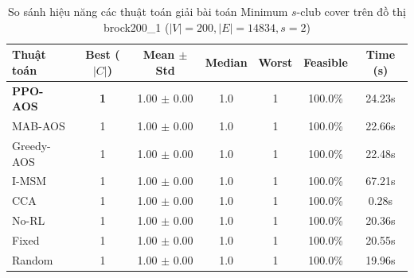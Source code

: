 \begin{table}[htbp]
\centering
\caption{So sánh hiệu năng các thuật toán giải bài toán Minimum $s$-club cover trên đồ thị brock200_1 ($|V|=200, |E|=14834, s=2$)}
\label{tab:results_brock200_1}
\begin{tabular}{lcccccc}
\hline
\textbf{Thuật toán} & \textbf{Best ($|C|$)} & \textbf{Mean $\pm$ Std} & \textbf{Median} & \textbf{Worst} & \textbf{Feasible} & \textbf{Time (s)} \\
\hline
\textbf{PPO-AOS} & \textbf{1} & 1.00 $\pm$ 0.00 & 1.0 & 1 & 100.0\% & 24.23s \\
MAB-AOS & 1 & 1.00 $\pm$ 0.00 & 1.0 & 1 & 100.0\% & 22.66s \\
Greedy-AOS & 1 & 1.00 $\pm$ 0.00 & 1.0 & 1 & 100.0\% & 22.48s \\
I-MSM & 1 & 1.00 $\pm$ 0.00 & 1.0 & 1 & 100.0\% & 67.21s \\
CCA & 1 & 1.00 $\pm$ 0.00 & 1.0 & 1 & 100.0\% & 0.28s \\
No-RL & 1 & 1.00 $\pm$ 0.00 & 1.0 & 1 & 100.0\% & 20.36s \\
Fixed & 1 & 1.00 $\pm$ 0.00 & 1.0 & 1 & 100.0\% & 20.55s \\
Random & 1 & 1.00 $\pm$ 0.00 & 1.0 & 1 & 100.0\% & 19.96s \\
\hline
\end{tabular}
\end{table}
